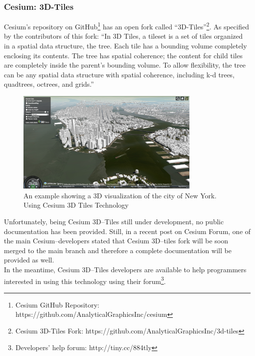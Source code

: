 \subsubsection{Cesium: 3D-Tiles}
Cesium's repository on GitHub\footnote{Cesium GitHub Repository: https://github.com/AnalyticalGraphicsInc/cesium} has an open fork called ``3D-Tiles''\footnote{Cesium 3D-Tiles Fork: https://github.com/AnalyticalGraphicsInc/3d-tiles}. As specified by the contributors of this fork:  ``In 3D Tiles, a tileset is a set of tiles organized in a spatial data structure, the tree. Each tile has a bounding volume completely enclosing its contents. The tree has spatial coherence; the content for child tiles are completely inside the parent's bounding volume. To allow flexibility, the tree can be any spatial data structure with spatial coherence, including k-d trees, quadtrees, octrees, and grids.''
\begin{figure} [H]
\centering
\includegraphics[width=0.8\textwidth]{chapter2/images/NewYorkCityCesium3dTiles}
\caption{An example showing a 3D visualization of the city of New York. Using Cesium 3D Tiles Technology}
\label{fig:NewYorkCityCesium3dTiles}
\end{figure}
Unfortunately, being Cesium 3D--Tiles still under development, no public documentation has been provided. Still, in a recent post on Cesium Forum, one of the main Cesium--developers stated that Cesium 3D--tiles fork will be soon merged to the main branch and therefore a complete documentation will be provided as well. \\In the meantime, Cesium 3D--Tiles developers are available to help programmers interested in using this technology using their forum\footnote{Developers' help forum: http://tiny.cc/884tly}.

